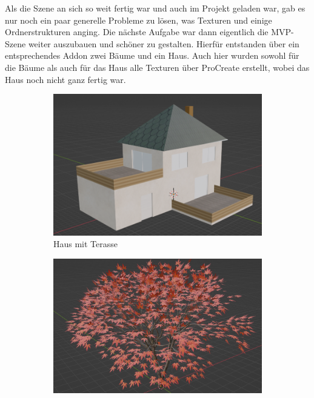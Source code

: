 Als die Szene an sich so weit fertig war und auch im Projekt geladen war, gab es nur noch ein paar generelle Probleme zu lösen, was Texturen und einige Ordnerstrukturen anging.
Die nächste Aufgabe war dann eigentlich die MVP-Szene weiter auszubauen und schöner zu gestalten. Hierfür entstanden über ein entsprechendes Addon zwei Bäume und ein Haus. Auch hier wurden sowohl für die Bäume als auch für das Haus alle Texturen über ProCreate erstellt, wobei das Haus noch nicht ganz fertig war.
\begin{figure}[H]

	\begin{subfigure}{0.5\textwidth}
		\includegraphics[height=0.3\pageheight,keepaspectratio]{pics/14}
		\caption{Haus mit Terasse}
	\end{subfigure}
	\begin{subfigure}{0.5\textwidth}
		\includegraphics[height=0.3\pageheight,keepaspectratio]{pics/15}

\end{subfigure}
\end{figure}
